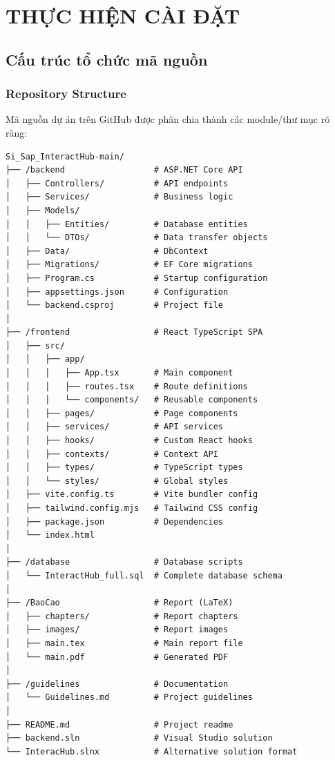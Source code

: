 \chapter{THỰC HIỆN CÀI ĐẶT}

\section{Cấu trúc tổ chức mã nguồn}

\subsection{Repository Structure}
Mã nguồn dự án trên GitHub được phân chia thành các module/thư mục rõ ràng:

\begin{verbatim}
Si_Sap_InteractHub-main/
├── /backend                  # ASP.NET Core API
│   ├── Controllers/          # API endpoints
│   ├── Services/             # Business logic
│   ├── Models/
│   │   ├── Entities/         # Database entities
│   │   └── DTOs/             # Data transfer objects
│   ├── Data/                 # DbContext
│   ├── Migrations/           # EF Core migrations
│   ├── Program.cs            # Startup configuration
│   ├── appsettings.json      # Configuration
│   └── backend.csproj        # Project file
│
├── /frontend                 # React TypeScript SPA
│   ├── src/
│   │   ├── app/
│   │   │   ├── App.tsx       # Main component
│   │   │   ├── routes.tsx    # Route definitions
│   │   │   └── components/   # Reusable components
│   │   ├── pages/            # Page components
│   │   ├── services/         # API services
│   │   ├── hooks/            # Custom React hooks
│   │   ├── contexts/         # Context API
│   │   ├── types/            # TypeScript types
│   │   └── styles/           # Global styles
│   ├── vite.config.ts        # Vite bundler config
│   ├── tailwind.config.mjs   # Tailwind CSS config
│   ├── package.json          # Dependencies
│   └── index.html
│
├── /database                 # Database scripts
│   └── InteractHub_full.sql  # Complete database schema
│
├── /BaoCao                   # Report (LaTeX)
│   ├── chapters/             # Report chapters
│   ├── images/               # Report images
│   ├── main.tex              # Main report file
│   └── main.pdf              # Generated PDF
│
├── /guidelines               # Documentation
│   └── Guidelines.md         # Project guidelines
│
├── README.md                 # Project readme
├── backend.sln               # Visual Studio solution
└── InteracHub.slnx           # Alternative solution format
\end{verbatim}

